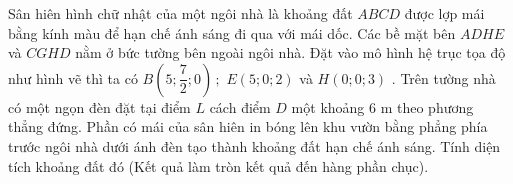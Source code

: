 \begin{ex}%
	Sân hiên hình chữ nhật của một ngôi nhà là khoảng đất $ABCD$ được lợp mái bằng kính màu để hạn chế ánh sáng đi qua với mái dốc. Các bề mặt bên $ADHE$ và $CGHD$ nằm ở bức tường bên ngoài ngôi nhà. Đặt vào mô hình hệ trục tọa độ như hình vẽ thì ta có $B\left(5;\dfrac{7}{2};0\right)\,;\,\,E\left(5;0;2\right)$ và $H\left(0;0;3\right)$ . Trên tường nhà có một ngọn đèn đặt tại điểm $L$ cách điểm $D$ một khoảng $6$ m theo phương thẳng đứng. Phần có mái của sân hiên in bóng lên khu vườn bằng phẳng phía trước ngôi nhà dưới ánh đèn tạo thành khoảng đất hạn chế ánh sáng. Tính diện tích khoảng đất đó (Kết quả làm tròn kết quả đến hàng phần chục).
\end{ex}
